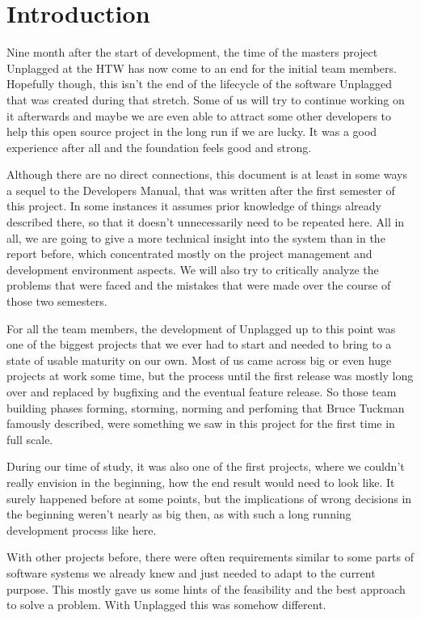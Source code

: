\chapter*{Introduction}

Nine month after the start of development, the time of the masters project Unplagged at the HTW has now come to an end for the 
initial team members. Hopefully though, 
this isn't the end of the lifecycle of the software Unplagged that was created during that stretch. Some of us will try to continue working on it afterwards and maybe we are even able to attract some other developers to help this open source project in the long run if we are lucky. It was a good experience after all and the foundation feels good and strong.

Although there are no direct connections, this document is at least in some ways a sequel to the Developers Manual, that was
written after the first semester of this project. In some instances it assumes prior knowledge of things already described there, so that it doesn't unnecessarily need to be repeated here.
All in all, we are going to give a more technical insight into the system than in the report before, which concentrated mostly
on the project management and development environment aspects. We will also try to critically 
analyze the problems that were faced and the mistakes that were made over the course of those
two semesters.

For all the team members, the development of Unplagged up to this point was one of 
the biggest 
projects that we ever had to start and needed to bring to a state of usable 
maturity on our own. Most of us came across big or even huge projects at work some time, but the process until 
the first release was mostly long over and replaced by bugfixing and the eventual feature release.
So those team building phases forming, storming, norming and perfoming that Bruce Tuckman famously described\citep{tuckman1965},
were something we saw in this project for the first time in full scale.

During our time of study, it was also one of the first projects, 
where we couldn't really envision in the beginning, how the end result would need to look like. It surely happened before at some points, but the implications of wrong decisions in the beginning weren't nearly as big then, as with such a long running development process like here.

With other projects before, there were often requirements similar to some
parts of software systems we already knew and just needed to adapt to the current purpose.
This mostly gave us some hints of the feasibility and the best approach to solve a problem.
With Unplagged this was somehow different.

